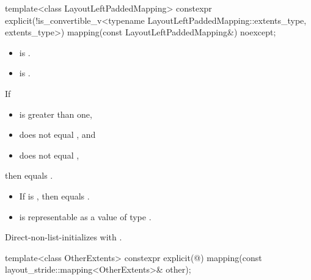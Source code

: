 %
\begin{itemdecl}
template<class LayoutLeftPaddedMapping>
  constexpr explicit(!is_convertible_v<typename LayoutLeftPaddedMapping::extents_type,
                                       extents_type>)
    mapping(const LayoutLeftPaddedMapping&) noexcept;
\end{itemdecl}

\begin{itemdescr}
\pnum
\constraints
\begin{itemize}
\item
{} is .
\item
{}\newline is .
\end{itemize}

\pnum
\mandates
If
\begin{itemize}
\item
{} is greater than one,
\item
{} does not equal , and
\item
{}
does not equal ,
\end{itemize}
then  equals
.

\pnum
\expects
\begin{itemize}
\item
If  is ,
then  equals .
\item
{} is representable as
a value of type .
\end{itemize}

\pnum
\effects
Direct-non-list-initializes  with .
\end{itemdescr}

%
\begin{itemdecl}
template<class OtherExtents>
  constexpr explicit(@\seebelow@)
    mapping(const layout_stride::mapping<OtherExtents>& other);
\end{itemdecl}

